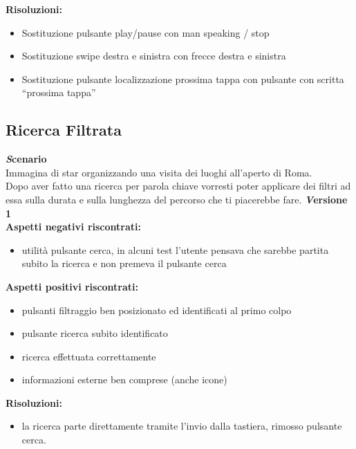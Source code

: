 \textbf{Risoluzioni:}
\begin{itemize}[label=-]

\item Sostituzione pulsante play/pause con man speaking / stop
\item Sostituzione swipe destra e sinistra con frecce destra e sinistra
\item Sostituzione pulsante localizzazione prossima tappa con pulsante con scritta “prossima tappa”

\end{itemize}


\subsection{Ricerca Filtrata}
\textbf{\emph Scenario}\\
Immagina di star organizzando una visita dei luoghi all’aperto di Roma.\\
Dopo aver fatto una ricerca per parola chiave vorresti poter applicare dei filtri ad essa sulla durata e sulla lunghezza del percorso che ti piacerebbe fare.
\newline
\textbf{\emph Versione 1}\\
\textbf{Aspetti negativi riscontrati:}
\begin{itemize}[label=-]

\item utilità pulsante cerca, in alcuni test l’utente pensava che sarebbe partita subito la ricerca e non premeva il pulsante cerca

\end{itemize}

\textbf{Aspetti positivi riscontrati:}
\begin{itemize}[label=-]

\item pulsanti filtraggio ben posizionato ed identificati al primo colpo
\item pulsante ricerca subito identificato
\item ricerca effettuata correttamente
\item informazioni esterne ben comprese (anche icone)

\end{itemize}

\textbf{Risoluzioni:}
\begin{itemize}[label=-]

\item la ricerca parte direttamente tramite l’invio dalla tastiera, rimosso pulsante cerca.

\end{itemize}

